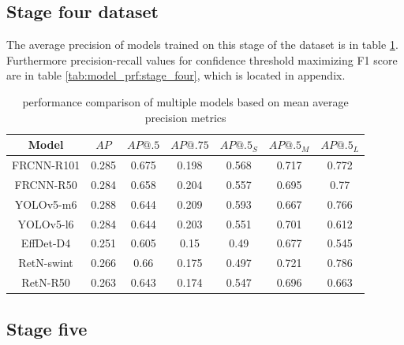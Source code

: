 \subsection{Stage four dataset}
The average precision of models trained on this stage of the dataset is in table \ref{tab:model_results:stage_four}. Furthermore precision-recall values for confidence threshold maximizing F1 score are in table \ref{tab:model_prf:stage_four}, which is located in appendix.

\begin{table}[H]
    \begin{tabular}{|c|c|c|c|c|c|c|}
        \hline
        Model      & $AP$  & $AP@.5$ & $AP@.75$ & $AP@.5_S$ & $AP@.5_M$ & $AP@.5_L$ \\ \hline
        FRCNN-R101 & 0.285 & 0.675   & 0.198    & 0.568     & 0.717     & 0.772     \\ \hline
        FRCNN-R50  & 0.284 & 0.658   & 0.204    & 0.557     & 0.695     & 0.77      \\ \hline
        YOLOv5-m6  & 0.288 & 0.644   & 0.209    & 0.593     & 0.667     & 0.766     \\ \hline
        YOLOv5-l6  & 0.284 & 0.644   & 0.203    & 0.551     & 0.701     & 0.612     \\ \hline
        EffDet-D4  & 0.251 & 0.605   & 0.15     & 0.49      & 0.677     & 0.545     \\ \hline
        RetN-swint & 0.266 & 0.66    & 0.175    & 0.497     & 0.721     & 0.786     \\ \hline
        RetN-R50   & 0.263 & 0.643   & 0.174    & 0.547     & 0.696     & 0.663     \\ \hline
    \end{tabular}
    \caption{performance comparison of multiple models based on mean average precision metrics}
    \label{tab:model_results:stage_four}
\end{table}

\subsection{Stage five}

